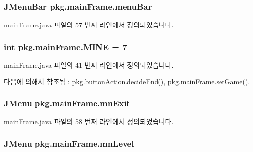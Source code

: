 \subsubsection[{\texorpdfstring{menu\+Bar}{menuBar}}]{\setlength{\rightskip}{0pt plus 5cm}J\+Menu\+Bar pkg.\+main\+Frame.\+menu\+Bar\hspace{0.3cm}{\ttfamily [private]}}\hypertarget{classpkg_1_1main_frame_a83694a00c25375434549ffd58d10ad77}{}\label{classpkg_1_1main_frame_a83694a00c25375434549ffd58d10ad77}


main\+Frame.\+java 파일의 57 번째 라인에서 정의되었습니다.

\subsubsection[{\texorpdfstring{M\+I\+NE}{MINE}}]{\setlength{\rightskip}{0pt plus 5cm}int pkg.\+main\+Frame.\+M\+I\+NE = 7\hspace{0.3cm}{\ttfamily [static]}}\hypertarget{classpkg_1_1main_frame_a2d3b62dc427e3bfd3247b51456d78882}{}\label{classpkg_1_1main_frame_a2d3b62dc427e3bfd3247b51456d78882}


main\+Frame.\+java 파일의 41 번째 라인에서 정의되었습니다.



다음에 의해서 참조됨 \+:  pkg.\+button\+Action.\+decide\+End(), pkg.\+main\+Frame.\+set\+Game().

\subsubsection[{\texorpdfstring{mn\+Exit}{mnExit}}]{\setlength{\rightskip}{0pt plus 5cm}J\+Menu pkg.\+main\+Frame.\+mn\+Exit\hspace{0.3cm}{\ttfamily [private]}}\hypertarget{classpkg_1_1main_frame_ae8893bf8bbe88ef0095ae7aa423e2b23}{}\label{classpkg_1_1main_frame_ae8893bf8bbe88ef0095ae7aa423e2b23}


main\+Frame.\+java 파일의 58 번째 라인에서 정의되었습니다.

\subsubsection[{\texorpdfstring{mn\+Level}{mnLevel}}]{\setlength{\rightskip}{0pt plus 5cm}J\+Menu pkg.\+main\+Frame.\+mn\+Level\hspace{0.3cm}{\ttfamily [private]}}\hypertarget{classpkg_1_1main_frame_adceefa443b0c2344aa1ad15f8da92dac}{}\label{classpkg_1_1main_frame_adceefa443b0c2344aa1ad15f8da92dac}



